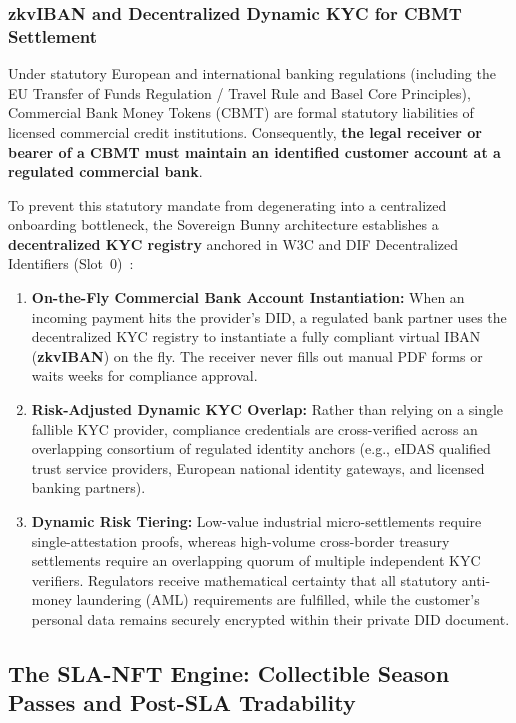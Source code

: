 \documentclass[a4paper,11pt,twoside,parskip=half-,headings=small]{scrartcl}
\begin{document}
\subsubsection{zkvIBAN and Decentralized Dynamic KYC for CBMT Settlement}

Under statutory European and international banking regulations (including the EU Transfer of
Funds Regulation / Travel Rule and Basel Core Principles), Commercial Bank Money Tokens (CBMT)
are formal statutory liabilities of licensed commercial credit institutions. Consequently,
\textbf{the legal receiver or bearer of a CBMT must maintain an identified customer account at
a regulated commercial bank}.

To prevent this statutory mandate from degenerating into a centralized onboarding bottleneck,
the Sovereign Bunny architecture establishes a \textbf{decentralized KYC registry} anchored in
W3C and DIF Decentralized Identifiers (Slot~0)~\cite{dif2021did}:
\begin{enumerate}
  \item \textbf{On-the-Fly Commercial Bank Account Instantiation:} When an incoming payment hits
the provider's DID, a regulated bank partner uses the decentralized KYC registry to instantiate
a fully compliant virtual IBAN (\textbf{zkvIBAN}) on the fly. The receiver never fills out manual
PDF forms or waits weeks for compliance approval.
  \item \textbf{Risk-Adjusted Dynamic KYC Overlap:} Rather than relying on a single fallible KYC
provider, compliance credentials are cross-verified across an overlapping consortium of regulated
identity anchors (e.g., eIDAS qualified trust service providers, European national identity gateways,
and licensed banking partners). 
  \item \textbf{Dynamic Risk Tiering:} Low-value industrial micro-settlements require single-attestation
proofs, whereas high-volume cross-border treasury settlements require an overlapping quorum of
multiple independent KYC verifiers. Regulators receive mathematical certainty that all statutory
anti-money laundering (AML) requirements are fulfilled, while the customer's personal data remains
securely encrypted within their private DID document.
\end{enumerate}

\subsection{The SLA-NFT Engine: Collectible Season Passes and Post-SLA Tradability}
\label{sec:sla_nft_tradability}
\end{document}
